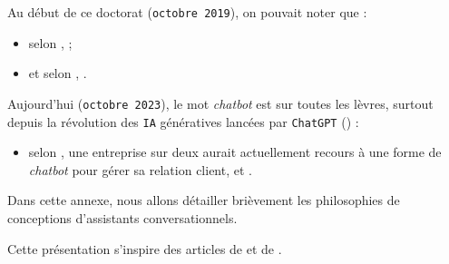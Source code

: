 \label{annex:B-ANNEXE-CHATBOT}
	
	
	Au début de ce doctorat (\texttt{octobre 2019}), on pouvait noter que :
	\begin{itemize}
		\item selon \cite{costello-lodolce:2019:gartner-top-technologies},  ;
		\item et selon \cite{goasduff:2019:chatbots-will-appeal}, .
	\end{itemize}
	
	Aujourd'hui (\texttt{octobre 2023}), le mot \textit{chatbot} est sur toutes les lèvres, surtout depuis la révolution des \texttt{IA} génératives lancées par \texttt{ChatGPT} (\cite{openai:2023:chatgpt}) :
	\begin{itemize}
		\item selon \cite{costello-lodolce:2022:gartner-predicts-chatbots}, une entreprise sur deux aurait actuellement recours à une forme de \textit{chatbot} pour gérer sa relation client, et .
	\end{itemize}

	Dans cette annexe, nous allons détailler brièvement les philosophies de conceptions d'assistants conversationnels.
	
	\begin{leftBarInformation}
		Cette présentation s'inspire des articles de \cite{chen-etal:2017:survey-dialogue-systems} et de \cite{adamopoulou-moussiades:2020:overview-chatbot-technology}.
	\end{leftBarInformation}
	
	\minitoc
	
	
	
	
